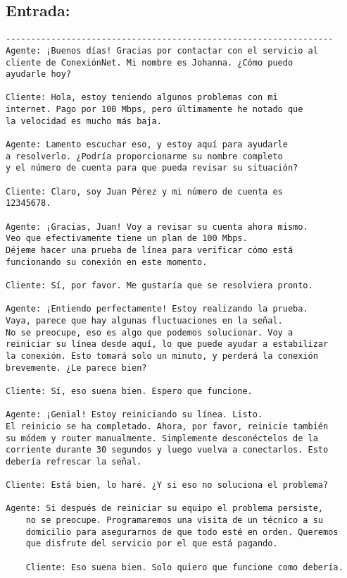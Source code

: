 \subsection*{Entrada:}
\begin{verbatim}
-----------------------------------------------------------------    
Agente: ¡Buenos días! Gracias por contactar con el servicio al 
cliente de ConexiónNet. Mi nombre es Johanna. ¿Cómo puedo 
ayudarle hoy?

Cliente: Hola, estoy teniendo algunos problemas con mi 
internet. Pago por 100 Mbps, pero últimamente he notado que 
la velocidad es mucho más baja.

Agente: Lamento escuchar eso, y estoy aquí para ayudarle 
a resolverlo. ¿Podría proporcionarme su nombre completo 
y el número de cuenta para que pueda revisar su situación?

Cliente: Claro, soy Juan Pérez y mi número de cuenta es 
12345678.

Agente: ¡Gracias, Juan! Voy a revisar su cuenta ahora mismo.
Veo que efectivamente tiene un plan de 100 Mbps. 
Déjeme hacer una prueba de línea para verificar cómo está 
funcionando su conexión en este momento.

Cliente: Sí, por favor. Me gustaría que se resolviera pronto.

Agente: ¡Entiendo perfectamente! Estoy realizando la prueba.
Vaya, parece que hay algunas fluctuaciones en la señal. 
No se preocupe, eso es algo que podemos solucionar. Voy a 
reiniciar su línea desde aquí, lo que puede ayudar a estabilizar 
la conexión. Esto tomará solo un minuto, y perderá la conexión 
brevemente. ¿Le parece bien?

Cliente: Sí, eso suena bien. Espero que funcione.

Agente: ¡Genial! Estoy reiniciando su línea. Listo. 
El reinicio se ha completado. Ahora, por favor, reinicie también 
su módem y router manualmente. Simplemente desconéctelos de la 
corriente durante 30 segundos y luego vuelva a conectarlos. Esto 
debería refrescar la señal.

Cliente: Está bien, lo haré. ¿Y si eso no soluciona el problema?

Agente: Si después de reiniciar su equipo el problema persiste, 
    no se preocupe. Programaremos una visita de un técnico a su 
    domicilio para asegurarnos de que todo esté en orden. Queremos 
    que disfrute del servicio por el que está pagando.

    Cliente: Eso suena bien. Solo quiero que funcione como debería.


\end{verbatim}
